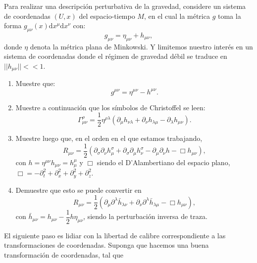 \documentclass[../main]{subfiles}
\begin{document}
\begin{adjustwidth}{0pt}{-100pt}
\begin{enumerate}
    Para realizar una descripción perturbativa de la gravedad, considere un sistema de coordenadas $(U, x)$ del espacio-tiempo $M$, en el cual la métrica $g$ toma la forma $g_{\mu\nu}(x)\mathrm{d}x^{\mu}\mathrm{d}x^{\nu}$ con:
    \begin{equation}
        g_{\mu\nu}=\eta_{\mu\nu}+h_{\mu\nu},
    \end{equation}
    donde $\eta$ denota la métrica plana de Minkowski. Y limitemos nuestro interés en un sistema de coordenadas donde el régimen de gravedad débil se traduce en $||h_{\mu\nu}||<<1$.
    \begin{enumerate}[label=(\alph*)]
        \item Muestre que: 
        \begin{equation}
            g^{\mu\nu}=\eta^{\mu\nu}-h^{\mu\nu}.
        \end{equation}
        \item Muestre a continuación que los símbolos de Christoffel se leen:
        \begin{equation}
            \Gamma^{\rho}_{\mu\nu}=\dfrac{1}{2}\eta^{\rho\lambda}(\partial_{\mu} h_{\nu\lambda}+\partial_{\nu}h_{\lambda\mu}-\partial_{\lambda}h_{\mu\nu}).
        \end{equation}
        \item Muestre luego que, en el orden en el que estamos trabajando,
        \begin{equation}
            R_{\mu\nu}=\dfrac{1}{2}(\partial_{\sigma}\partial_{\nu}h^{\sigma}_{\mu}+\partial_{\sigma}\partial_{\mu}h^{\sigma}_{\nu}-\partial_{\mu}\partial_{\nu}h-\Box h_{\mu\nu}),
        \end{equation}
        con $h=\eta^{\mu\nu} h_{\mu\nu}=h^{\mu}_{\mu}$ y $\Box$ siendo el D'Alambertiano del espacio plano, $\Box=-\partial^2_t+\partial^2_x+\partial^2_y+\partial^2_z$.
        \item Demuestre que esto se puede convertir en 
        \begin{equation}
            R_{\mu\nu}=\dfrac{1}{2}(\partial_{\mu}\partial^{\lambda}\bar{h}_{\lambda\nu}+\partial_{\nu}\partial^{\lambda}\bar{h}_{\lambda\mu}-\Box h_{\mu\nu}),
        \end{equation}
        con $\bar{h}_{\mu\nu}=h_{\mu\nu}-\dfrac{1}{2}h \eta_{\mu\nu}$, siendo la perturbación inversa de traza.
    \end{enumerate}
    El siguiente paso es lidiar con la libertad de calibre correspondiente a las transformaciones de coordenadas. Suponga que hacemos una buena transformación de coordenadas, tal que 

\end{enumerate}
\end{adjustwidth}
\end{document}
